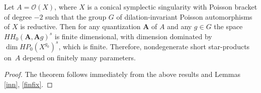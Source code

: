 \begin{Theorem}\label{finde3} Let $A=\mathcal{O}(X)$, where $X$ is a conical symplectic singularity
with Poisson bracket of degree $-2$ such that the group $G$ of dilation-invariant Poisson automorphisms of $X$ is reductive. Then for any quantization ${\mathbf A}$ of $A$ and any $g\in G$ the space $HH_0({\mathbf A},{\mathbf A}g)^s$ is finite dimensional, with dimension dominated by $\dim HP_0(X^{g_0})^s$, which is finite. Therefore, nondegenerate short star-products on~$A$ depend on finitely many parameters.
\end{Theorem}

\begin{proof}The theorem follows immediately from the above results and Lemmas \ref{inn}, \ref{finfix}.
\end{proof}
